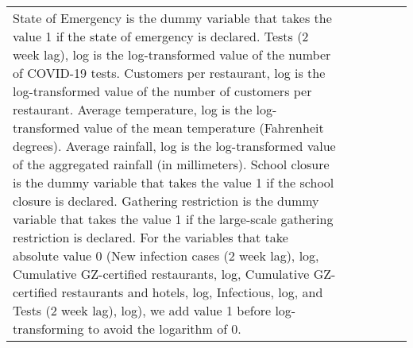 \begin{table}[H]
\begin{tabular}{@{\extracolsep{1pt}}lccccc}
{{State of Emergency is the dummy variable that takes the value 1 if the state of emergency is declared. 
Tests (2 week lag), log is the log-transformed value of the number of COVID-19 tests.
Customers per restaurant, log is the log-transformed value of the number of customers per restaurant.
Average temperature, log is the log-transformed value of the mean temperature (Fahrenheit degrees).
Average rainfall, log is the log-transformed value of the aggregated rainfall (in millimeters).
School closure is the dummy variable that takes the value 1 if the school closure is declared. 
Gathering restriction is the dummy variable that takes the value 1 if the large-scale gathering restriction is declared.
For the variables that take absolute value 0 (New infection cases (2 week lag), log, Cumulative GZ-certified restaurants, log, Cumulative GZ-certified restaurants and hotels, log, Infectious, log, and Tests (2 week lag), log), we add value 1 before log-transforming to avoid the logarithm of 0.}} \\
\end{tabular} 
\end{table} 

